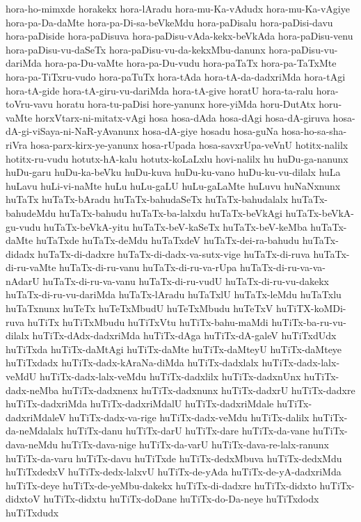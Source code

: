 {hora-ho-mimxde
horakekx
hora-lAradu
hora-mu-Ka-vAdudx
hora-mu-Ka-vAgiye
hora-pa-Da-daMte
hora-pa-Di-sa-beVkeMdu
hora-paDisalu
hora-paDisi-davu
hora-paDiside
hora-paDisuva
hora-paDisu-vAda-kekx-beVkAda
hora-paDisu-venu
hora-paDisu-vu-daSeTx
hora-paDisu-vu-da-kekxMbu-danunx
hora-paDisu-vu-dariMda
hora-pa-Du-vaMte
hora-pa-Du-vudu
hora-paTaTx
hora-pa-TaTxMte
hora-pa-TiTxru-vudo
hora-paTuTx
hora-tAda
hora-tA-da-dadxriMda
hora-tAgi
hora-tA-gide
hora-tA-giru-vu-dariMda
hora-tA-give
horatU
hora-ta-ralu
hora-toVru-vavu
horatu
hora-tu-paDisi
hore-yanunx
hore-yiMda
horu-DutAtx
horu-vaMte
horxVtarx-ni-mitatx-vAgi
hosa
hosa-dAda
hosa-dAgi
hosa-dA-giruva
hosa-dA-gi-viSaya-ni-NaR-yAvanunx
hosa-dA-giye
hosadu
hosa-guNa
hosa-ho-sa-sha-riVra
hosa-parx-kirx-ye-yanunx
hosa-rUpada
hosa-savxrUpa-veVnU
hotitx-nalilx
hotitx-ru-vudu
hotutx-hA-kalu
hotutx-koLaLxlu
hovi-nalilx
hu
huDu-ga-nanunx
huDu-garu
huDu-ka-beVku
huDu-kuva
huDu-ku-vano
huDu-ku-vu-dilalx
huLa
huLavu
huLi-vi-naMte
huLu
huLu-gaLU
huLu-gaLaMte
huLuvu
huNaNxnunx
huTaTx
huTaTx-bAradu
huTaTx-bahudaSeTx
huTaTx-bahudalalx
huTaTx-bahudeMdu
huTaTx-bahudu
huTaTx-ba-lalxdu
huTaTx-beVkAgi
huTaTx-beVkA-gu-vudu
huTaTx-beVkA-yitu
huTaTx-beV-kaSeTx
huTaTx-beV-keMba
huTaTx-daMte
huTaTxde
huTaTx-deMdu
huTaTxdeV
huTaTx-dei-ra-bahudu
huTaTx-didadx
huTaTx-di-dadxre
huTaTx-di-dadx-va-sutx-vige
huTaTx-di-ruva
huTaTx-di-ru-vaMte
huTaTx-di-ru-vanu
huTaTx-di-ru-va-rUpa
huTaTx-di-ru-va-va-nAdarU
huTaTx-di-ru-va-vanu
huTaTx-di-ru-vudU
huTaTx-di-ru-vu-dakekx
huTaTx-di-ru-vu-dariMda
huTaTx-lAradu
huTaTxlU
huTaTx-leMdu
huTaTxlu
huTaTxnunx
huTeTx
huTeTxMbudU
huTeTxMbudu
huTeTxV
huTiTX-koMDi-ruva
huTiTx
huTiTxMbudu
huTiTxVtu
huTiTx-bahu-maMdi
huTiTx-ba-ru-vu-dilalx
huTiTx-dAdx-dadxriMda
huTiTx-dAga
huTiTx-dA-galeV
huTiTxdUdx
huTiTxda
huTiTx-daMtAgi
huTiTx-daMte
huTiTx-daMteyU
huTiTx-daMteye
huTiTxdadx
huTiTx-dadx-kAraNa-diMda
huTiTx-dadxlalx
huTiTx-dadx-lalx-veMdU
huTiTx-dadx-lalx-veMdu
huTiTx-dadxlilx
huTiTx-dadxnUnx
huTiTx-dadx-neMba
huTiTx-dadxnenx
huTiTx-dadxnunx
huTiTx-dadxrU
huTiTx-dadxre
huTiTx-dadxriMda
huTiTx-dadxriMdalU
huTiTx-dadxriMdale
huTiTx-dadxriMdaleV
huTiTx-dadx-va-rige
huTiTx-dadx-veMdu
huTiTx-dalilx
huTiTx-da-neMdalalx
huTiTx-danu
huTiTx-darU
huTiTx-dare
huTiTx-da-vane
huTiTx-dava-neMdu
huTiTx-dava-nige
huTiTx-da-varU
huTiTx-dava-re-lalx-ranunx
huTiTx-da-varu
huTiTx-davu
huTiTxde
huTiTx-dedxMbuva
huTiTx-dedxMdu
huTiTxdedxV
huTiTx-dedx-lalxvU
huTiTx-de-yAda
huTiTx-de-yA-dadxriMda
huTiTx-deye
huTiTx-de-yeMbu-dakekx
huTiTx-di-dadxre
huTiTx-didxto
huTiTx-didxtoV
huTiTx-didxtu
huTiTx-doDane
huTiTx-do-Da-neye
huTiTxdodx
huTiTxdudx
}
